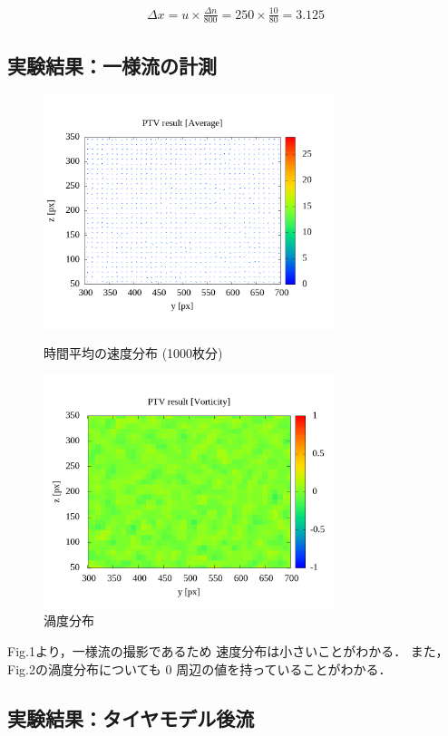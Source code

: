 \documentclass[twocolumn,a4j]{jsarticle}
\begin{document}
\begin{eqnarray*}
  \Delta x = u \times \frac{\Delta n}{800} = 250 \times \frac{10}{80} = 3.125
\end{eqnarray*}


\newpage

\subsection{実験結果：一様流の計測}

\begin{figure}[htbp]
  \footnotesize
  \begin{center}
    \includegraphics[width=85mm]{../images/uniform_ave.png}
    \caption{時間平均の速度分布 (1000枚分)}
    \includegraphics[width=85mm]{../images/uniform_vor.png}
    \caption{渦度分布}
  \end{center}
\end{figure}

Fig.1より，一様流の撮影であるため
速度分布は小さいことがわかる．
また，Fig.2の渦度分布についても
0 周辺の値を持っていることがわかる．\\

\newpage

\subsection{実験結果：タイヤモデル後流}
\end{document}
